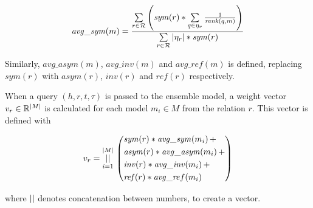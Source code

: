 \begin{equation}
\mathit{avg\_sym}(m) = 
\frac{ \sum\limits_{r \in \mathcal{R}} \left( \mathit{sym}(r) * \sum\limits_{q \in \eta_r} \frac{1}{\mathit{rank}(q , m)} \right) }
{ \sum\limits_{r \in \mathcal{R}} |\eta_r| * \mathit{sym}(r) }
\end{equation}

\noindent
Similarly, $\mathit{avg\_asym}(m)$, $\mathit{avg\_inv}(m)$ and $\mathit{avg\_ref}(m)$ is defined, replacing $\mathit{sym}(r)$ with $\mathit{asym}(r)$, $\mathit{inv}(r)$ and $\mathit{ref}(r)$ respectively.

When a query $(h, r, t, \tau)$ is passed to the ensemble model, a weight vector $v_r \in \mathbb{R}^{|M|}$ is calculated for each model $m_i \in M$ from the relation $r$. This vector is defined with

\begin{equation}
v_r = \operatorname*{||}\limits_{i = 1}^{|M|} \, \left(
\begin{aligned}
&\mathit{sym}(r) * \mathit{avg\_sym}(m_i) \, + \\
&\mathit{asym}(r) * \mathit{avg\_asym}(m_i) \, + \\
&\mathit{inv}(r) * \mathit{avg\_inv}(m_i) \, + \\
&\mathit{ref}(r) * \mathit{avg\_re}f(m_i)
\end{aligned} \right)
\end{equation}

\noindent
where $\operatorname*{||}$ denotes concatenation between numbers, to create a vector.



